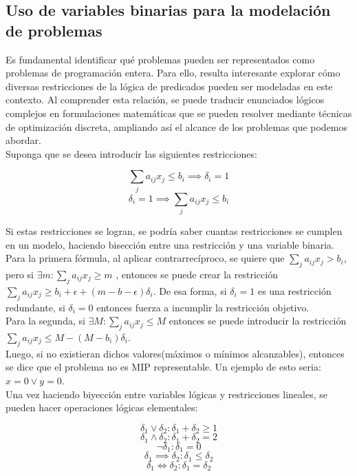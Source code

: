 \documentclass[12pt]{report}
\begin{document}
\subsection{Uso de variables binarias para la modelación de problemas\\}


Es fundamental identificar qué problemas pueden ser representados como problemas de programación entera. Para ello, resulta interesante explorar cómo diversas restricciones de la lógica de predicados pueden ser modeladas en este contexto. Al comprender esta relación, se puede traducir enunciados lógicos complejos en formulaciones matemáticas que se pueden resolver mediante técnicas de optimización discreta, ampliando así el alcance de los problemas que podemos abordar.\\

Suponga que se desea introducir las siguientes restricciones:

$$ \sum_j a_{ij}x_j \leq  b_i \implies  \delta_i = 1$$
$$  \delta_i = 1 \implies  \sum_j a_{ij}x_j \leq  b_i$$

Si estas restricciones se logran, se podría saber cuantas restricciones se cumplen en un modelo, haciendo bisección entre una restricción y una variable binaria.\\

Para la primera fórmula, al aplicar contrarrecíproco, se quiere que $\sum_j a_{ij}x_j > b_i$, pero si $\exists m:\sum_j a_{ij}x_j\geq  m$ , entonces se puede crear la restricción $\sum_j a_{ij}x_j \geq  b_i+\epsilon+(m-b-\epsilon)\delta_i$. De esa forma, si $\delta_i=1$ es una restricción redundante, si $\delta_i=0$ entonces fuerza a incumplir la restricción objetivo.\\

Para la segunda, si $\exists M:\sum_j a_{ij}x_j\leq  M$ entonces se puede introducir la restricción $\sum_j a_{ij}x_j \leq  M-(M-b_i)\delta_i$. \\

Luego, si no existieran dichos valores(máximos o mínimos alcanzables), entonces se dice que el problema no es MIP representable. Un ejemplo de esto seria: $x=0\lor  y=0$.\\

Una vez haciendo biyección entre variables lógicas y restricciones lineales, se pueden hacer operaciones lógicas elementales:

$$\delta_1 \lor  \delta_2:\delta_1+\delta_2\geq 1$$
$$\delta_1 \land \delta_2:\delta_1+\delta_2=2$$
$$\neg\delta_1 :\delta_1=0$$
$$\delta_1 \implies  \delta_2:\delta_1\leq  \delta_2$$
$$\delta_1 \iff \delta_2:\delta_1=\delta_2$$
\end{document}
